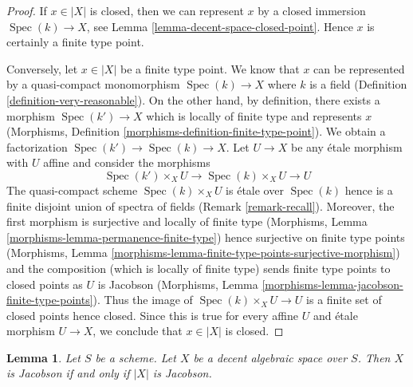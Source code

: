 \documentclass{stacks-project}
\theoremstyle{plain}
\newtheorem{lemma}[subsection]{Lemma}
\theoremstyle{definition}
\theoremstyle{remark}
\numberwithin{equation}{subsection}
\def\Spec{\mathop{\mathrm{Spec}}}
\begin{document}
\begin{proof}
If $x \in |X|$ is closed, then we can represent $x$ by a closed
immersion $\Spec(k) \to X$, see Lemma \ref{lemma-decent-space-closed-point}.
Hence $x$ is certainly a finite type point.

\medskip\noindent
Conversely, let $x \in |X|$ be a finite type point. We know that
$x$ can be represented by a quasi-compact monomorphism
$\Spec(k) \to X$ where $k$ is a field
(Definition \ref{definition-very-reasonable}). On the other hand,
by definition, there exists a morphism $\Spec(k') \to X$
which is locally of finite type and represents $x$
(Morphisms, Definition \ref{morphisms-definition-finite-type-point}).
We obtain a factorization $\Spec(k') \to \Spec(k) \to X$.
Let $U \to X$ be any \'etale morphism with $U$ affine and consider
the morphisms
$$
\Spec(k') \times_X U \to \Spec(k) \times_X U \to U
$$
The quasi-compact scheme $\Spec(k) \times_X U$ is \'etale over
$\Spec(k)$ hence is a finite disjoint union
of spectra of fields (Remark \ref{remark-recall}).
Moreover, the first morphism is surjective and locally of finite type
(Morphisms, Lemma \ref{morphisms-lemma-permanence-finite-type})
hence surjective on finite type points
(Morphisms, Lemma \ref{morphisms-lemma-finite-type-points-surjective-morphism})
and the composition (which is locally of finite type) sends
finite type points to closed points as $U$ is Jacobson
(Morphisms, Lemma \ref{morphisms-lemma-jacobson-finite-type-points}).
Thus the image of
$\Spec(k) \times_X U \to U$ is a finite set of closed points hence
closed. Since this is true for every affine $U$ and \'etale morphism
$U \to X$, we conclude that $x \in |X|$ is closed.
\end{proof}

\begin{lemma}
\label{lemma-decent-Jacobson}
Let $S$ be a scheme. Let $X$ be a decent algebraic space over $S$.
Then $X$ is Jacobson if and only if $|X|$ is Jacobson.
\end{lemma}
\end{document}
